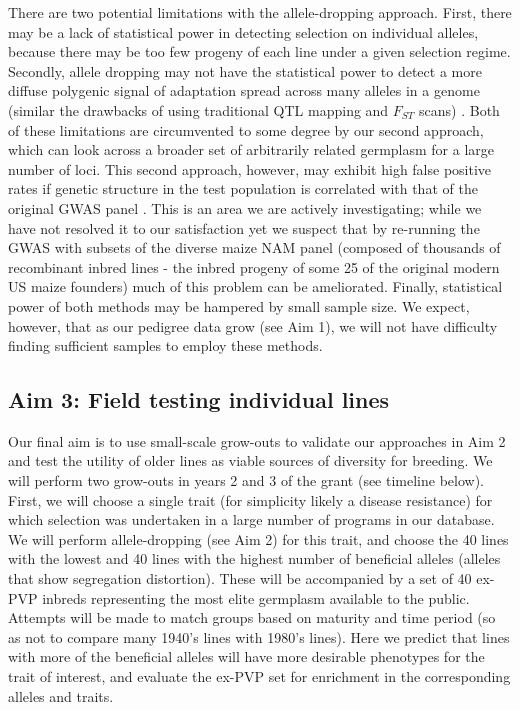 \documentclass[12pt]{article}
\begin{document}
There are two potential limitations with the allele-dropping approach. First, there may be a lack of statistical power in detecting selection on individual alleles, because there may be too few progeny of each line under a given selection regime. 
Secondly, allele dropping may not have the statistical power to detect a more diffuse polygenic signal of adaptation spread across many alleles in a genome (similar the drawbacks of using traditional QTL mapping and $F_{ST}$ scans) \cite{Rockman:2011ej, Berg:2014bs}. 
Both of these limitations are circumvented to some degree by our second approach, which can look across a broader set of arbitrarily related germplasm for a large number of loci.
This second approach, however, may exhibit high false positive rates if genetic structure in the test population is correlated with that of the original GWAS panel \citep{Berg:2014bs}. 
This is an area we are actively investigating; while we have not resolved it to our satisfaction yet we suspect that by re-running the GWAS with subsets of the diverse maize NAM \citep{mcmullen2009genetic} panel (composed of thousands of recombinant inbred lines - the inbred progeny of some 25 of the original modern US maize founders) much of this problem can be ameliorated.      
Finally, statistical power of both methods may be hampered by small sample size.
We expect, however, that as our pedigree data grow (see Aim 1), we will not have difficulty finding sufficient samples to employ these methods.

\subsection*{Aim 3: Field testing individual lines}

Our final aim is to use small-scale grow-outs to validate our approaches in Aim 2 and test the utility of older lines as viable sources of diversity for breeding.
We will perform two grow-outs in years 2 and 3 of the grant (see timeline below).
First, we will choose a single trait (for simplicity likely a disease resistance) for which selection was undertaken in a large number of programs in our database.
We will perform allele-dropping (see Aim 2) for this trait, and choose the 40 lines with the lowest and 40 lines with the highest number of beneficial alleles (alleles that show segregation distortion).
These will be accompanied by a set of 40 ex-PVP inbreds representing the most elite germplasm available to the public. 
Attempts will be made to match groups based on maturity and time period (so as not to compare many 1940's lines with 1980's lines).
Here we predict that lines with more of the beneficial alleles will have more desirable phenotypes for the trait of interest, and evaluate the ex-PVP set for enrichment in the corresponding alleles and traits.
\end{document}
